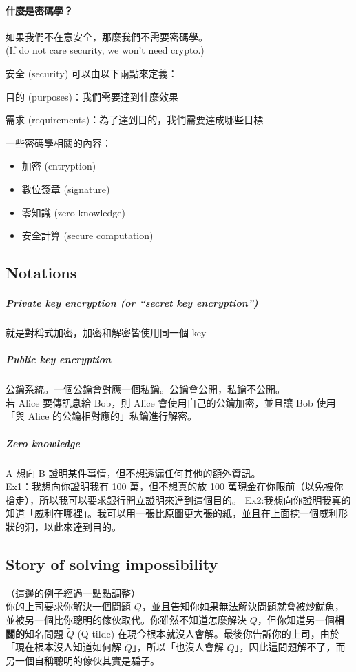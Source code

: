 \paragraph{什麼是密碼學？}

如果我們不在意安全，那麼我們不需要密碼學。 \\
(If do not care security, we won't need crypto.)

安全 (security) 可以由以下兩點來定義：
\begin{myItemize}
	\item 目的 (purposes)：我們需要達到什麼效果
	\item 需求 (requirements)：為了達到目的，我們需要達成哪些目標
\end{myItemize}

一些密碼學相關的內容：
\begin{itemize}
	\item 加密 (entryption)
	\item 數位簽章 (signature)
	\item 零知識 (zero knowledge)
	\item 安全計算 (secure computation)
\end{itemize}


\subsection{Notations}

\subparagraph{Private key encryption (or “secret key encryption”)}
就是對稱式加密，加密和解密皆使用同一個 key

\subparagraph{Public key encryption}
公鑰系統。一個公鑰會對應一個私鑰。公鑰會公開，私鑰不公開。 \\
若 Alice 要傳訊息給 Bob，則 Alice 會使用自己的公鑰加密，並且讓 Bob 使用「與 Alice 的公鑰相對應的」私鑰進行解密。

\subparagraph{Zero knowledge}
A 想向 B 證明某件事情，但不想透漏任何其他的額外資訊。 \\
Ex1：我想向你證明我有 100 萬，但不想真的放 100 萬現金在你眼前（以免被你搶走），所以我可以要求銀行開立證明來達到這個目的。
Ex2:我想向你證明我真的知道「威利在哪裡」。我可以用一張比原圖更大張的紙，並且在上面挖一個威利形狀的洞，以此來達到目的。


\subsection{Story of solving impossibility}

（這邊的例子經過一點點調整） \\
你的上司要求你解決一個問題 \(Q\)，並且告知你如果無法解決問題就會被炒魷魚，並被另一個比你聰明的傢伙取代。你雖然不知道怎麼解決 \(Q\)，但你知道另一個\textbf{相關的}知名問題 \(\widetilde{Q}\) (Q tilde) 在現今根本就沒人會解。最後你告訴你的上司，由於「現在根本沒人知道如何解 \(\widetilde{Q}\)」，所以「也沒人會解 \(Q\)」，因此這問題解不了，而另一個自稱聰明的傢伙其實是騙子。


